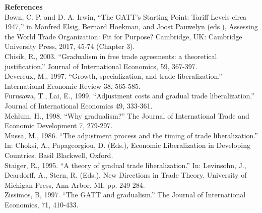 \documentclass[12pt]{article}
\begin{document}
\newpage
\noindent\large\textbf{References}\\

\normalsize \noindent Bown, C. P. and D. A. Irwin, ``The GATT's Starting Point: Tariff Levels circa 1947,'' in Manfred Elsig, Bernard Hoekman, and Joost Pauwelyn (eds.), Assessing the World Trade Organization: Fit for Purpose? Cambridge, UK: Cambridge University Press, 2017, 45-74 (Chapter 3).\\

\noindent Chisik, R., 2003. ``Gradualism in free trade agreements: a theoretical justification.'' Journal of International Economics, 59, 367-397. \\

\noindent Devereux, M., 1997. ``Growth, specialization, and trade liberalization.'' International Economic Review
38, 565-585. \\

\noindent Furusawa, T., Lai, E., 1999. ``Adjustment costs and gradual trade liberalization.'' Journal of International
Economics 49, 333-361. \\

\noindent Mehlum, H., 1998. ``Why gradualism?'' The Journal of International Trade and Economic Development 7, 279-297. \\

\noindent Mussa, M., 1986. ``The adjustment process and the timing of trade liberalization.'' In: Choksi, A., Papageorgiou, D. (Eds.), Economic Liberalization in Developing Countries. Basil Blackwell, Oxford. \\

\noindent Staiger, R., 1995. ``A theory of gradual trade liberalization.'' In: Levinsohn, J., Deardorff, A., Stern, R.
(Eds.), New Directions in Trade Theory. University of Michigan Press, Ann Arbor, MI, pp. 249-284. \\

\noindent Zissimos, B, 1997. ``The GATT and gradualism.'' The Journal of International Economics, 71, 410-433.\\
\end{document}
